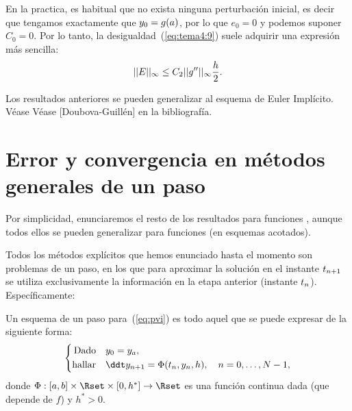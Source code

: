 \begin{remark}
  \label{rk:8}
  En la practica, es habitual que no exista ninguna perturbación
  inicial, es decir que tengamos exactamente que $y_0=g(a)$, por lo
  que $e_0=0$ y podemos suponer $C_0=0$. Por lo tanto, la
  desigualdad~(\ref{eq:tema4:9}) suele adquirir una expresión más
  sencilla:
    \begin{equation}
    \label{eq:tema4:9}
    ||E||_\infty \le C_2 ||g''||_\infty \frac h2.
  \end{equation}
\end{remark}

\begin{remark}
  Los resultados anteriores se pueden generalizar al esquema de Euler Implícito. Véase
  Véase [Doubova-Guillén] en la bibliografía.
\end{remark}

\section{Error y convergencia en métodos generales de un paso}
\label{sec:convergencia-metodos-1paso}

Por simplicidad, enunciaremos  el resto de los resultados para
funciones \globLipschitz, aunque todos ellos se pueden generalizar para
funciones \locLipschitz (en esquemas acotados). %


Todos los métodos explícitos que hemos enunciado hasta el momento son
problemas de un paso, en los que para aproximar la solución en el
instante ${t_{n+1}}$ se utiliza exclusivamente la información en la etapa
anterior (instante ${t_n}$). Específicamente:
\begin{definition}
  Un esquema de un paso para~(\ref{eq:pvi}) es todo aquel que se puede
  expresar de la siguiente forma:
  \begin{equation}
    \label{eq:pb-general-1paso}
    \left\{
      \begin{aligned}
        \text{Dado}\quad &y_0 = \ycero,\\
        \text{hallar}\quad &\ddt\ynn = \Phi(\tn,\yn, h), \quad
        n=0,\dots, N-1,
      \end{aligned}
    \right.
  \end{equation}
  donde $\Phi:[\ta,\tb]\times \Rset \times [0,h^*] \to \Rset$ es una
  función continua dada (que depende de $f$) y $h^*>0$.
\end{definition}


